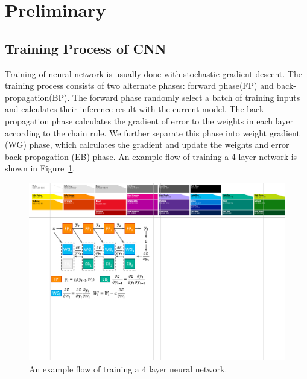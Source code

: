 \section{Preliminary}\label{sec:preliminary}

\subsection{Training Process of CNN}
Training of neural network is usually done with stochastic gradient descent. The training process consists of two alternate phases: forward phase(FP) and back-propagation(BP). The forward phase randomly select a batch of training inputs and calculates their inference result with the current model. The back-propagation phase calculates the gradient of error to the weights in each layer according to the chain rule. We further separate this phase into weight gradient (WG) phase, which calculates the gradient and update the weights and error back-propagation (EB) phase. An example flow of training a 4 layer network is shown in Figure~\ref{fig:train_prelim}.

\begin{figure}[t]
  \centering
  \includegraphics[width=1\columnwidth]{figures/train_prelim.pdf}
  \caption{An example flow of training a 4 layer neural network. }
  \label{fig:train_prelim}
\end{figure}

